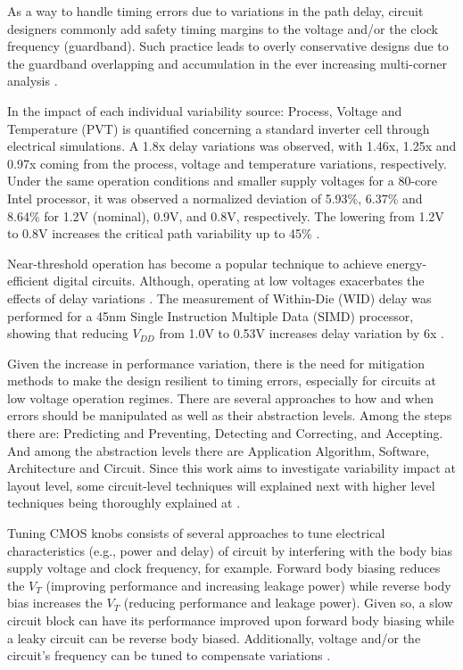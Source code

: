 \documentclass[diss,pgmicro,english]{iiufrgs}
\begin{document}
As a way to handle timing errors due to variations in the path delay, circuit designers commonly add safety timing margins to the voltage and/or the clock frequency (guardband). Such practice leads to overly conservative designs due to the guardband overlapping and accumulation in the ever increasing multi-corner analysis \cite{austin2005opportunities}.

In \cite{jeong2009impact} the impact of each individual variability source: Process, Voltage and Temperature (PVT) is quantified concerning a standard inverter cell through electrical simulations. A 1.8x delay variations was observed, with 1.46x, 1.25x and 0.97x coming from the process, voltage and temperature variations, respectively. Under the same operation conditions and smaller supply voltages for a 80-core Intel processor, it was observed a normalized deviation of 5.93\%, 6.37\% and 8.64\% for 1.2V (nominal), 0.9V, and 0.8V, respectively. The lowering from 1.2V to 0.8V increases the critical path variability up to 45\% \cite{dighe2011within}.

Near-threshold operation has become a popular technique to achieve energy-efficient digital circuits. Although, operating at low voltages exacerbates the effects of delay variations \cite{jeon2012design, dreslinski2010near, rithe2011effect, kakoee2012variation, pawlowski2012530mv}.
The measurement of Within-Die (WID) delay was performed for a 45nm Single Instruction Multiple Data (SIMD) processor, showing that reducing $V_{DD}$ from 1.0V to 0.53V increases delay variation by 6x \cite{pawlowski2012530mv}.

Given the increase in performance variation, there is the need for mitigation methods to make the design resilient to timing errors, especially for circuits at low voltage operation regimes. There are several approaches to how and when errors should be manipulated as well as their abstraction levels. Among the steps there are: Predicting and Preventing, Detecting and Correcting, and Accepting. And among the abstraction levels there are Application Algorithm, Software, Architecture and Circuit. Since this work aims to investigate variability impact at layout level, some circuit-level techniques will explained next with higher level techniques being thoroughly explained at \cite{rahimi2016variability}.

Tuning CMOS knobs consists of several approaches to tune electrical characteristics (e.g., power and delay) of circuit by interfering with the body bias supply voltage and clock frequency, for example. Forward body biasing reduces the $V_T$ (improving performance and increasing leakage power) while reverse body bias increases the $V_T$ (reducing performance and leakage power). Given so, a slow circuit block can have its performance improved upon forward body biasing while a leaky circuit can be reverse body biased. Additionally, voltage and/or the circuit's frequency can be tuned to compensate variations \cite{dighe2011within, tschanz2002adaptive, borkar2004design}.
\end{document}
